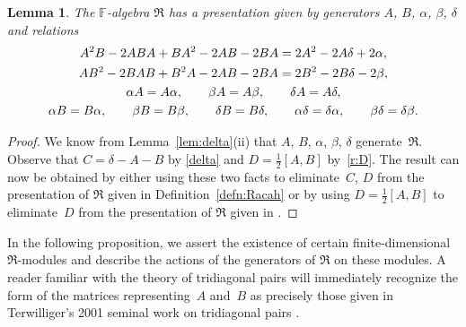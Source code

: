 \documentclass[11pt]{article}
\numberwithin{equation}{section}
\def\F{\mathbb F}
\numberwithin{equation}{section}
\newtheorem{Lemma}[Theorem]{Lemma}
\begin{document}
\begin{Lemma}\label{lem:presentationR}The $\F$-algebra $\Re$ has a presentation given by generators $A$, $B$, $\alpha$, $\beta$, $\delta$ and relations
\begin{gather}
A^2 B-2 A B A+B A^2-2AB-2BA=2A^2-2A\delta +2\alpha,\label{AAB}\\
AB^2-2BAB+B^2 A-2 AB-2 BA= 2B^2-2B\delta-2\beta,\label{ABB}\\
\alpha A = A\alpha, \qquad\beta A = A\beta, \qquad\delta A = A\delta,\notag\\
\alpha B = B\alpha,\qquad\beta B = B\beta,\qquad\delta B = B\delta,\qquad
 \alpha \delta = \delta \alpha,\qquad \beta \delta = \delta \beta. \notag
\end{gather}
\end{Lemma}
\begin{proof}We know from Lemma~\ref{lem:delta}(ii) that $A$, $B$, $\alpha$, $\beta$, $\delta$ generate~$\Re$. Observe that $C=\delta-A-B$ by \eqref{delta} and $D=\frac{1}{2}[A,B]$ by~\eqref{r:D}. The result can now be obtained by either using these two facts to eliminate~$C$, $D$ from the presentation of $\Re$ given in Definition~\ref{defn:Racah} or by using $D=\frac{1}{2}[A,B]$ to eliminate~$D$ from the presentation of $\Re$ given in \cite[Proposition~3.4]{SH:2017-1}.
\end{proof}

In the following proposition, we assert the existence of certain finite-dimensional $\Re$-modules and describe the actions of the generators of $\Re$ on these modules. A reader familiar with the theory of tridiagonal pairs will immediately recognize the form of the matrices representing~$A$ and~$B$ as precisely those given in Terwilliger's 2001 seminal work on tridiagonal pairs \cite[Theorem~3.2]{lp2001}.
\end{document}
